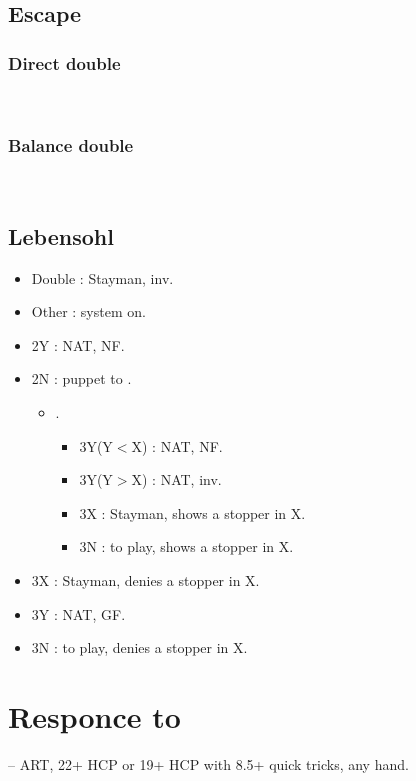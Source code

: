 \documentclass[12pt,twoside,a5paper]{report}%
\begin{document}
	\section*{Escape}
		\subsection*{Direct double}
		\\

		\subsection*{Balance double}
		\\

	\section*{Lebensohl}
		\begin{itemize}
		\renewcommand{\labelitemi}{}
		\item Double : Stayman, inv.
		\item Other : system on.
		\end{itemize}

		\begin{itemize}
		\renewcommand{\labelitemi}{}
		\item 2Y : NAT, NF.
		\item 2N : puppet to .
			\begin{itemize}
			\renewcommand{\labelitemi}{--}
			\item {}.
				\begin{itemize}
					\item 3Y(Y$<$X) : NAT, NF.
					\item 3Y(Y$>$X) : NAT, inv.
					\item 3X : Stayman, shows a stopper in X.
					\item 3N : to play, shows a stopper in X.
				\end{itemize}
			\end{itemize}
		\item 3X : Stayman, denies a stopper in X.
		\item 3Y : NAT, GF.
		\item 3N : to play, denies a stopper in X.
		\end{itemize}
\chapter*{Responce to }
	-- ART, 22+ HCP or 19+ HCP with 8.5+ quick tricks, any hand.
\end{document}
